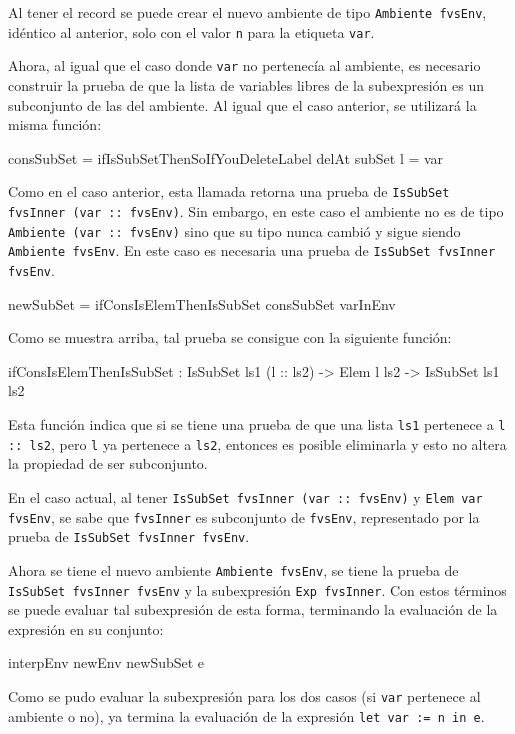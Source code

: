Al tener el record se puede crear el nuevo ambiente de tipo \texttt{Ambiente fvsEnv}, idéntico al anterior, solo con el valor \texttt{n} para la etiqueta \texttt{var}.

Ahora, al igual que el caso donde \texttt{var} no pertenecía al ambiente, es necesario construir la prueba de que la lista de variables libres de la subexpresión es un subconjunto de las del ambiente. Al igual que el caso anterior, se utilizará la misma función:

\begin{code}
consSubSet = 
  ifIsSubSetThenSoIfYouDeleteLabel delAt subSet {l = var}
\end{code}

Como en el caso anterior, esta llamada retorna una prueba de \texttt{IsSubSet fvsInner (var :: fvsEnv)}. Sin embargo, en este caso el ambiente no es de tipo \texttt{Ambiente (var :: fvsEnv)} sino que su tipo nunca cambió y sigue siendo \texttt{Ambiente fvsEnv}. En este caso es necesaria una prueba de \texttt{IsSubSet fvsInner fvsEnv}. 

\begin{code}
newSubSet = ifConsIsElemThenIsSubSet consSubSet varInEnv
\end{code}

Como se muestra arriba, tal prueba se consigue con la siguiente función:

\begin{code}
ifConsIsElemThenIsSubSet : IsSubSet ls1 (l :: ls2) ->
    Elem l ls2 -> IsSubSet ls1 ls2
\end{code}

Esta función indica que si se tiene una prueba de que una lista \texttt{ls1} pertenece a \texttt{l :: ls2}, pero \texttt{l} ya pertenece a \texttt{ls2}, entonces es posible eliminarla y esto no altera la propiedad de ser subconjunto.

En el caso actual, al tener \texttt{IsSubSet fvsInner (var :: fvsEnv)} y \texttt{Elem var fvsEnv}, se sabe que \texttt{fvsInner} es subconjunto de \texttt{fvsEnv}, representado por la prueba de \texttt{IsSubSet fvsInner fvsEnv}.

Ahora se tiene el nuevo ambiente \texttt{Ambiente fvsEnv}, se tiene la prueba de \texttt{IsSubSet fvsInner fvsEnv} y la subexpresión \texttt{Exp fvsInner}. Con estos términos se puede evaluar tal subexpresión de esta forma, terminando la evaluación de la expresión en su conjunto:

\begin{code}
interpEnv newEnv newSubSet e
\end{code}

Como se pudo evaluar la subexpresión para los dos casos (si \texttt{var} pertenece al ambiente o no), ya termina la evaluación de la expresión \texttt{let var := n in e}.
